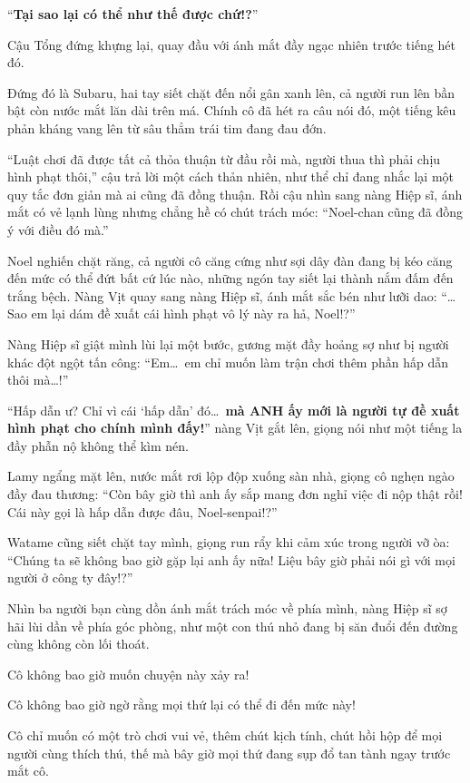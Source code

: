 \documentclass[../main.tex]{subfiles}
\begin{document}
``\textbf{Tại sao lại có thể như thế được chứ!?}''

Cậu Tổng đứng khựng lại, quay đầu với ánh mắt đầy ngạc nhiên trước tiếng hét đó.

Đứng đó là Subaru, hai tay siết chặt đến nổi gân xanh lên, cả người run lên bần bật còn nước mắt lăn dài trên má. Chính cô đã hét ra câu nói đó, một tiếng kêu phản kháng vang lên từ sâu thẳm trái tim đang đau đớn.

``Luật chơi đã được tất cả thỏa thuận từ đầu rồi mà, người thua thì phải chịu hình phạt thôi,'' cậu trả lời một cách thản nhiên, như thể chỉ đang nhắc lại một quy tắc đơn giản mà ai cũng đã đồng thuận. Rồi cậu nhìn sang nàng Hiệp sĩ, ánh mắt có vẻ lạnh lùng nhưng chẳng hề có chút trách móc: ``Noel-chan cũng đã đồng ý với điều đó mà.''

Noel nghiến chặt răng, cả người cô căng cứng như sợi dây đàn đang bị kéo căng đến mức có thể đứt bất cứ lúc nào, những ngón tay siết lại thành nắm đấm đến trắng bệch. Nàng Vịt quay sang nàng Hiệp sĩ, ánh mắt sắc bén như lưỡi dao: ``\dots Sao em lại dám đề xuất cái hình phạt vô lý này ra hả, Noel!?''

Nàng Hiệp sĩ giật mình lùi lại một bước, gương mặt đầy hoảng sợ như bị người khác đột ngột tấn công: ``Em\dots\ em chỉ muốn làm trận chơi thêm phần hấp dẫn thôi mà\dots!''

``Hấp dẫn ư? Chỉ vì cái `hấp dẫn' đó\dots\ \textbf{mà ANH ấy mới là người tự đề xuất hình phạt cho chính mình đấy!}'' nàng Vịt gắt lên, giọng nói như một tiếng la đầy phẫn nộ không thể kìm nén.

Lamy ngẩng mặt lên, nước mắt rơi lộp độp xuống sàn nhà, giọng cô nghẹn ngào đầy đau thương: ``Còn bây giờ thì anh ấy sắp mang đơn nghỉ việc đi nộp thật rồi! Cái này gọi là hấp dẫn được đâu, Noel-senpai!?''

Watame cũng siết chặt tay mình, giọng run rẩy khi cảm xúc trong người vỡ òa: ``Chúng ta sẽ không bao giờ gặp lại anh ấy nữa! Liệu bây giờ phải nói gì với mọi người ở công ty đây!?''

Nhìn ba người bạn cùng dồn ánh mắt trách móc về phía mình, nàng Hiệp sĩ sợ hãi lùi dần về phía góc phòng, như một con thú nhỏ đang bị săn đuổi đến đường cùng không còn lối thoát.

Cô không bao giờ muốn chuyện này xảy ra!

Cô không bao giờ ngờ rằng mọi thứ lại có thể đi đến mức này!

Cô chỉ muốn có một trò chơi vui vẻ, thêm chút kịch tính, chút hồi hộp để mọi người cùng thích thú, thế mà bây giờ mọi thứ đang sụp đổ tan tành ngay trước mắt cô.
\end{document}
